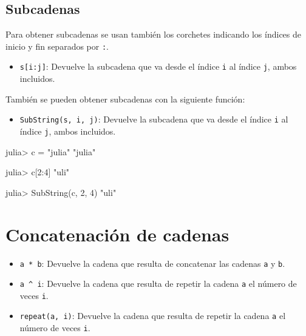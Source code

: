\documentclass[
  letterpaper,
  DIV=11,
  numbers=noendperiod]{scrreprt}
\newenvironment{Shaded}{\begin{snugshade}}{\end{snugshade}}
\newcommand{\FloatTok}[1]{\textcolor[rgb]{0.68,0.00,0.00}{#1}}
\newcommand{\FunctionTok}[1]{\textcolor[rgb]{0.28,0.35,0.67}{#1}}
\newcommand{\NormalTok}[1]{\textcolor[rgb]{0.00,0.23,0.31}{#1}}
\newcommand{\OperatorTok}[1]{\textcolor[rgb]{0.37,0.37,0.37}{#1}}
\newcommand{\StringTok}[1]{\textcolor[rgb]{0.13,0.47,0.30}{#1}}
\providecommand{\tightlist}{%
  \setlength{\itemsep}{0pt}\setlength{\parskip}{0pt}}\usepackage{longtable,booktabs,array}
\begin{document}
\hypertarget{subcadenas}{%
\subsection{Subcadenas}\label{subcadenas}}

Para obtener subcadenas se usan también los corchetes indicando los
índices de inicio y fin separados por \texttt{:}.

\begin{itemize}
\tightlist
\item
  \texttt{s{[}i:j{]}}: Devuelve la subcadena que va desde el índice
  \texttt{i} al índice \texttt{j}, ambos incluidos.
\end{itemize}

También se pueden obtener subcadenas con la siguiente función:

\begin{itemize}
\tightlist
\item
  \texttt{SubString(s,\ i,\ j)}: Devuelve la subcadena que va desde el
  índice \texttt{i} al índice \texttt{j}, ambos incluidos.
\end{itemize}

\begin{Shaded}
\begin{Highlighting}[]
\NormalTok{julia}\OperatorTok{\textgreater{}}\NormalTok{ c }\OperatorTok{=} \StringTok{"julia"}
\StringTok{"julia"}

\NormalTok{julia}\OperatorTok{\textgreater{}}\NormalTok{ c[}\FloatTok{2}\OperatorTok{:}\FloatTok{4}\NormalTok{]}
\StringTok{"uli"}

\NormalTok{julia}\OperatorTok{\textgreater{}} \FunctionTok{SubString}\NormalTok{(c, }\FloatTok{2}\NormalTok{, }\FloatTok{4}\NormalTok{)}
\StringTok{"uli"}
\end{Highlighting}
\end{Shaded}

\hypertarget{concatenaciuxf3n-de-cadenas}{%
\section{Concatenación de cadenas}\label{concatenaciuxf3n-de-cadenas}}

\begin{itemize}
\tightlist
\item
  \texttt{a\ *\ b}: Devuelve la cadena que resulta de concatenar las
  cadenas \texttt{a} y \texttt{b}.
\item
  \texttt{a\ \^{}\ i}: Devuelve la cadena que resulta de repetir la
  cadena \texttt{a} el número de veces \texttt{i}.
\item
  \texttt{repeat(a,\ i)}: Devuelve la cadena que resulta de repetir la
  cadena \texttt{a} el número de veces \texttt{i}.
\end{itemize}
\end{document}
